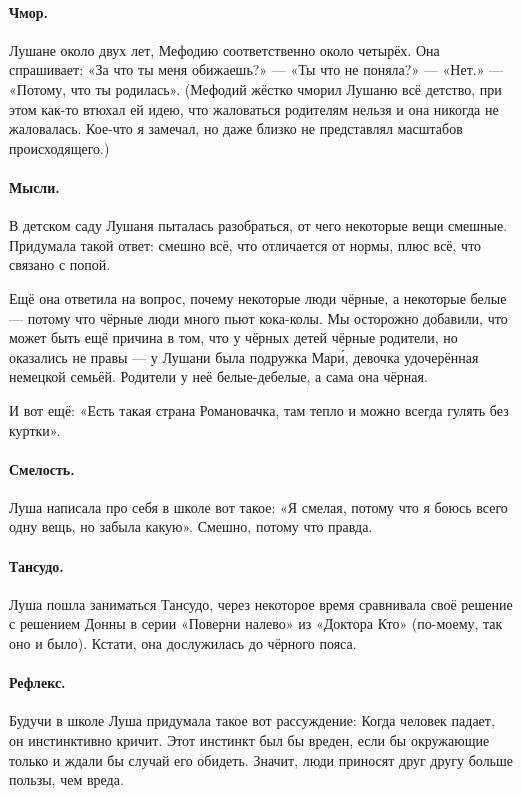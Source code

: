 \documentclass{book}
\begin{document}
\paragraph{Чмор.} Лушане около двух лет, Мефодию соответственно около четырёх.
Она спрашивает: «За что ты меня обижаешь?» --- «Ты что не поняла?» --- «Нет.» --- «Потому, что ты родилась».
(Мефодий жёстко чморил Лушаню всё детство,
при этом как-то втюхал ей идею, что жаловаться родителям нельзя и она никогда не жаловалась.
Кое-что я замечал, но даже близко не представлял масштабов происходящего.)

\paragraph{Мысли.}
В детском саду Лушаня пыталась разобраться, от чего некоторые вещи смешные.
Придумала такой ответ: смешно всё, что отличается от нормы, плюс всё, что связано с попой.

Ещё она ответила на вопрос, почему некоторые люди чёрные, а некоторые белые --- потому что чёрные люди много пьют кока-колы.
Мы осторожно добавили, что может быть ещё причина в том, что у чёрных детей чёрные родители, но оказались не правы --- у Лушани была подружка Мар\'{и}, девочка удочерённая немецкой семьёй.
Родители у неё белые-дебелые, а сама она чёрная.

И вот ещё: «Есть такая страна Романовачка, там тепло и можно всегда гулять без куртки».

\paragraph{Смелость.} Луша написала про себя в школе вот такое:
«Я смелая, потому что я боюсь всего одну вещь, но забыла какую».
Смешно, потому что правда.

\paragraph{Тансудо.} Луша пошла заниматься Тансудо, через некоторое время сравнивала своё решение с решением Донны в серии «Поверни налево» из «Доктора Кто» (по-моему, так оно и было).
Кстати, она дослужилась до чёрного пояса.

\paragraph{Рефлекс.} Будучи в школе Луша придумала такое вот рассуждение: 
Когда человек падает, он инстинктивно кричит.
Этот инстинкт был бы вреден, если бы окружающие только и ждали бы случай его обидеть.
Значит, люди приносят друг другу больше пользы, чем вреда.
\end{document}
